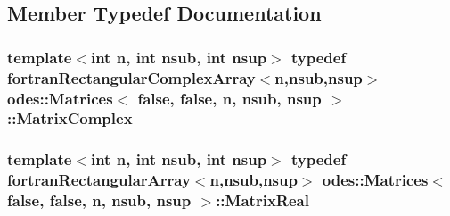\subsection{Member Typedef Documentation}
\hypertarget{classodes_1_1Matrices_3_01false_00_01false_00_01n_00_01nsub_00_01nsup_01_4_aeedabda8f5222d638b092cd1e4cf55f0}{
\subsubsection[{Matrix\-Complex}]{\setlength{\rightskip}{0pt plus 5cm}template$<$int n, int nsub, int nsup$>$ typedef {\bf fortran\-Rectangular\-Complex\-Array}$<$n,nsub,nsup$>$ {\bf odes\-::\-Matrices}$<$ false, false, n, nsub, nsup $>$\-::{\bf Matrix\-Complex}}}\label{classodes_1_1Matrices_3_01false_00_01false_00_01n_00_01nsub_00_01nsup_01_4_aeedabda8f5222d638b092cd1e4cf55f0}
\hypertarget{classodes_1_1Matrices_3_01false_00_01false_00_01n_00_01nsub_00_01nsup_01_4_a16870437fa110da1b60636c6e108b357}{
\subsubsection[{Matrix\-Real}]{\setlength{\rightskip}{0pt plus 5cm}template$<$int n, int nsub, int nsup$>$ typedef {\bf fortran\-Rectangular\-Array}$<$n,nsub,nsup$>$ {\bf odes\-::\-Matrices}$<$ false, false, n, nsub, nsup $>$\-::{\bf Matrix\-Real}}}\label{classodes_1_1Matrices_3_01false_00_01false_00_01n_00_01nsub_00_01nsup_01_4_a16870437fa110da1b60636c6e108b357}


